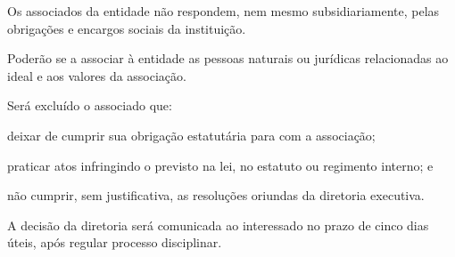 \documentclass{estatuto}
\begin{document}
\begin{artigos}
			\item Os associados da entidade não respondem, nem mesmo subsidiariamente, pelas obrigações e encargos sociais da instituição.
			\item Poderão se a associar à entidade as pessoas naturais ou jurídicas relacionadas ao ideal e aos valores da associação.
			\begin{paragrafos}
				\item Será excluído o associado que:
					\begin{itens}
						\item deixar de cumprir sua obrigação estatutária para com a associação;
						\item praticar atos infringindo o previsto na lei, no estatuto ou regimento interno; e
						\item não cumprir, sem justificativa, as resoluções oriundas da diretoria executiva.
					\end{itens}
				\item A decisão da diretoria será comunicada ao interessado no prazo de cinco dias úteis, após regular processo disciplinar.
			\end{paragrafos}

\end{artigos}
\end{document}
